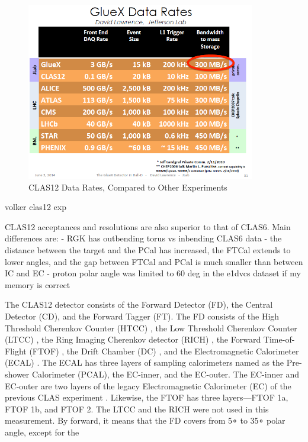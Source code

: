     \begin{figure}[H]
        \centering
        \includegraphics[width=10cm]{Chapters/Ch2-Experiment/clas-12-exp/clas-detectors/other/pics/good_data_rates_slide.png}
        \caption{CLAS12 Data Rates, Compared to Other Experiments }
    \end{figure}


    volker clas12 exp 

    
CLAS12 acceptances and resolutions are also superior to that of CLAS6. Main differences are:
- RGK has outbending torus vs inbending CLAS6 data
- the distance between the target and the PCal has increased, the FTCal extends to lower angles, and the gap between FTCal and PCal is much smaller than between IC and EC
- proton polar angle was limited to 60 deg in the e1dvcs dataset if my memory is correct






The CLAS12 detector consists of the Forward Detector (FD), the Central Detector
(CD), and the Forward Tagger (FT). The FD consists of the High Threshold
Cherenkov Counter (HTCC) \parencite{Sharabian2020TheCounter}, the Low Threshold Cherenkov Counter (LTCC)
\parencite{Ungaro2020TheDetector}, the Ring Imaging Cherenkov detector (RICH) \parencite{Contalbrigo2020TheDetector}, the Forward Time-of-Flight
(FTOF) \parencite{Carman2020TheSystem}, the Drift Chamber (DC) \parencite{Mestayer2020TheSystem}, and the Electromagnetic Calorimeter
(ECAL) \parencite{Asryan2020TheCalorimeter}. The ECAL has three layers of sampling calorimeters named as the
Pre-shower Calorimeter (PCAL), the EC-inner, and the EC-outer. The EC-inner and
EC-outer are two layers of the legacy Electromagnetic Calorimeter (EC) of the previous
CLAS experiment \parencite{Amarian2001TheCalorimeter}. Likewise, the FTOF has three layers—FTOF 1a, FTOF
1b, and FTOF 2. The LTCC and the RICH were not used in this measurement.
By forward, it means that the FD covers from 5∘ to 35∘ polar angle, except for the

